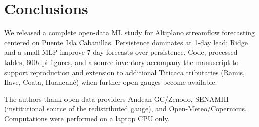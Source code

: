 \documentclass[graybox]{svmult}
\begin{document}
\section{Conclusions}
\label{sec:concl}
We released a complete open-data ML study for Altiplano streamflow forecasting centered on Puente Isla Cabanillas. Persistence dominates at 1-day lead; Ridge and a small MLP improve 7-day forecasts over persistence. Code, processed tables, 600\,dpi figures, and a source inventory accompany the manuscript to support reproduction and extension to additional Titicaca tributaries (Ramis, Ilave, Coata, Huancan\'e) when further open gauges become available.

\begin{acknowledgement}
The authors thank open-data providers Andean-GC/Zenodo, SENAMHI (institutional source of the redistributed gauge), and Open-Meteo/Copernicus. Computations were performed on a laptop CPU only.
\end{acknowledgement}




\end{document}
